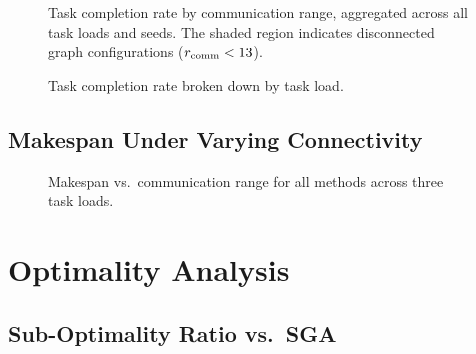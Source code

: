\begin{figure}[htbp]
  \centering
  \caption{Task completion rate by communication range, aggregated
           across all task loads and seeds. The shaded region
           indicates disconnected graph configurations
           ($r_{\text{comm}} < 13$).}
  \label{fig:completion_rate}
\end{figure}

\begin{figure}[htbp]
  \centering
  \caption{Task completion rate broken down by task load.}
  \label{fig:completion_rate_by_tpi}
\end{figure}


\subsection{Makespan Under Varying Connectivity}
\label{subsec:exp_makespan_comm}


\begin{figure}[htbp]
  \centering
  \caption{Makespan vs.\ communication range for all methods
           across three task loads.}
  \label{fig:makespan_vs_comm}
\end{figure}


\section{Optimality Analysis}
\label{sec:exp_optimality}


\subsection{Sub-Optimality Ratio vs.\ SGA}
\label{subsec:exp_suboptimality}

